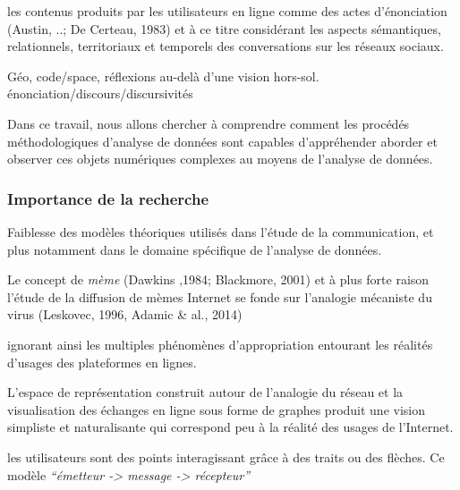 les contenus produits par les utilisateurs en ligne comme des actes d{\textquoteright}énonciation (Austin, ..; De Certeau, 1983) et à ce titre considérant les aspects sémantiques, relationnels, territoriaux et temporels des conversations sur les réseaux sociaux. 

Géo, code/space, réflexions au-delà d'une vision hors-sol.
énonciation/discours/discursivités



Dans ce travail, nous allons chercher à comprendre comment les procédés méthodologiques d{\textquoteright}analyse de données sont capables d{\textquoteright}appréhender aborder et observer ces objets numériques complexes au moyens de l'analyse de données.



\subsubsection{Importance de la recherche}

Faiblesse des modèles théoriques utilisés dans l'étude de la communication, et plus notamment dans le domaine spécifique de l'analyse de données.

Le concept de \textit{mème} (Dawkins ,1984; Blackmore, 2001) et à plus forte raison l{\textquoteright}étude de la diffusion de mèmes Internet se fonde sur l{\textquoteright}analogie mécaniste du virus (Leskovec, 1996, Adamic \& al., 2014)

ignorant ainsi les multiples phénomènes d{\textquoteright}appropriation entourant les réalités d{\textquoteright}usages des plateformes en lignes.

L'espace de représentation construit autour de l'analogie du réseau et la visualisation des échanges en ligne sous forme de graphes 
produit une vision simpliste et naturalisante qui correspond peu à la réalité des usages de l'Internet.

les utilisateurs sont des points interagissant gr\^ace à des traits ou des flèches. Ce modèle \textit{{\textquotedblleft}émetteur -{\textgreater} message -{\textgreater} récepteur{\textquotedblright} }

